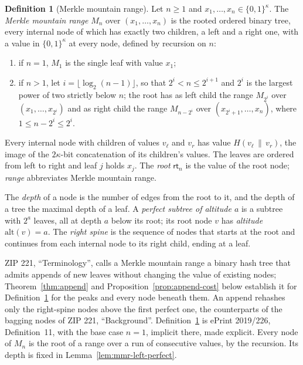 \documentclass[11pt,a4paper]{article}
\theoremstyle{definition}
\newtheorem{definition}[theorem]{Definition}
\begin{document}
\begin{definition}[Merkle mountain range]\label{def:mmr}
Let $n\ge 1$ and $x_1,\dots,x_n\in\{0,1\}^\kappa$. The \emph{Merkle mountain
range} $M_n$ over $(x_1,\dots,x_n)$ is the rooted ordered binary tree, every
internal node of which has exactly two children, a left and a right one, with
a value in $\{0,1\}^\kappa$ at every node, defined by recursion on $n$:
\begin{enumerate}
\item if $n=1$, $M_1$ is the single leaf with value $x_1$;
\item if $n>1$, let $i=\lfloor\log_2(n-1)\rfloor$, so that $2^i<n\le 2^{i+1}$
  and $2^i$ is the largest power of two strictly below $n$; the root has as
  left child the range $M_{2^i}$ over $(x_1,\dots,x_{2^i})$ and as right child
  the range $M_{n-2^i}$ over $(x_{2^i+1},\dots,x_n)$, where
  $1\le n-2^i\le 2^i$.
\end{enumerate}
Every internal node with children of values $v_\ell$ and $v_r$ has value
$H(v_\ell\,\|\,v_r)$, the image of the $2\kappa$-bit concatenation of its
children's values. The leaves are ordered from left to right and leaf $j$
holds $x_j$. The \emph{root} $\mathsf{rt}_n$ is the value of the root node;
\emph{range} abbreviates Merkle mountain range.

The \emph{depth} of a node is the number of edges from the root to it, and
the depth of a tree the maximal depth of a leaf. A \emph{perfect subtree of
altitude $a$} is a subtree with $2^a$ leaves, all at depth $a$ below its
root; its root node $v$ has \emph{altitude} $\mathrm{alt}(v)=a$. The
\emph{right spine} is the sequence of nodes that starts at the root and
continues from each internal node to its right child, ending at a leaf.
\end{definition}

ZIP 221, ``Terminology'', calls a Merkle mountain range a binary hash tree
that admits appends of new leaves without changing the value of existing
nodes; Theorem~\ref{thm:append} and Proposition~\ref{prop:append-cost} below
establish it for Definition~\ref{def:mmr} for the peaks and every node
beneath them. An append rehashes only the right-spine nodes above the first
perfect one, the counterparts of the bagging nodes of ZIP 221,
``Background''.
Definition~\ref{def:mmr} is ePrint
2019/226, Definition~11, with the base case $n=1$, implicit there, made
explicit. Every node of $M_n$ is the root of a range over a run of
consecutive values, by the recursion. Its depth is fixed in
Lemma~\ref{lem:mmr-left-perfect}.
\end{document}
